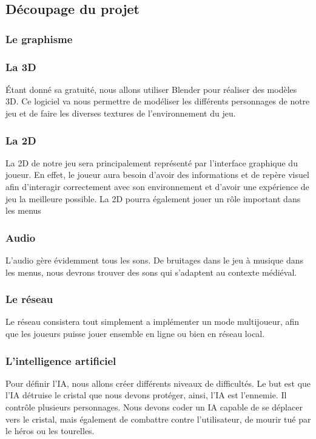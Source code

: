 \documentclass[a4paper, 12pt]{article}
\begin{document}
\subsection{Découpage du projet}
	\subsubsection{Le graphisme}
		\subsubsection{La 3D}
		Étant donné sa gratuité, nous allons utiliser Blender pour réaliser des modèles 3D. Ce logiciel va nous permettre de modéliser les différents personnages de notre jeu et de faire les diverses textures de l’environnement du jeu.

		\subsubsection{La 2D}
		La 2D de notre jeu sera principalement représenté par l'interface graphique du joueur. En effet, le joueur aura besoin d'avoir des informations et de repère visuel afin d'interagir correctement avec son environnement et d'avoir une expérience de jeu la meilleure possible. La 2D pourra également jouer un rôle important dans les menus
	\subsubsection{Audio}
	L’audio gère évidemment tous les sons. De bruitages dans le jeu à musique dans les menus, nous devrons trouver des sons qui s’adaptent au contexte médiéval.

	\subsubsection{Le réseau}
	Le réseau consistera tout simplement a implémenter un mode multijoueur, afin que les joueurs puisse jouer ensemble en ligne ou bien en réseau local.
	\subsubsection{L'intelligence artificiel}
	Pour définir l’IA, nous allons créer différents niveaux de difficultés. Le but est que l’IA détruise le cristal que nous devons protéger, ainsi, l’IA est l’ennemie. Il contrôle plusieurs personnages. Nous devons coder un IA capable de se déplacer vers le cristal, mais également de combattre contre l’utilisateur, de mourir tué par le héros ou les tourelles. 
\end{document}
